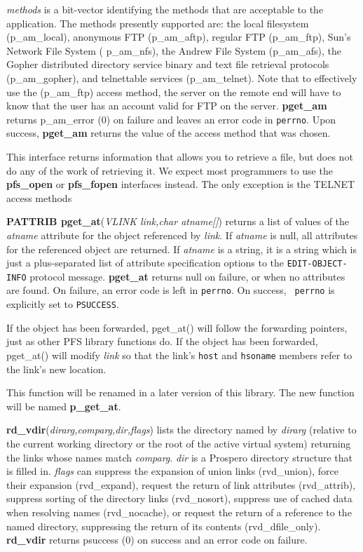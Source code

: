 {\it methods} is a bit-vector identifying the methods that are acceptable
to the application.  The methods presently supported are: the local
filesystem ({\sc p\_am\_local}), anonymous FTP ({\sc p\_am\_aftp}),
regular FTP ({\sc p\_am\_ftp}), Sun's Network File System ({\sc
p\_am\_nfs}), the Andrew File System ({\sc p\_am\_afs}), the Gopher
distributed directory service binary and text file retrieval protocols
({\sc p\_am\_gopher}), and telnettable services ({\sc p\_am\_telnet}).
Note that to effectively use the ({\sc p\_am\_ftp}) access method, the
server on the remote end will have to know that the user has an
account valid for FTP on the server.  {\bf pget\_am} returns {\sc
p\_am\_error} (0) on failure and leaves an error code in {\tt perrno}.
Upon success, {\bf pget\_am} returns the value of the access method
that was chosen.

This interface returns information that allows you to retrieve a file,
but does not do any of the work of retrieving it.  We expect most
programmers to use the {\bf pfs\_open} or {\bf pfs\_fopen} interfaces
instead.  The only exception is the TELNET access methods

{\bf PATTRIB pget\_at}({\it VLINK link,char atname[]}) returns a list of values of
the {\it atname} attribute for the object referenced by {\it link}.
If {\it atname} is {\sc null}, all attributes for the referenced
object are returned.  If {\it atname} is a string, it is a string
which is just a plus-separated list of attribute specification options
to the {\tt EDIT-OBJECT-INFO} protocol message.  {\bf pget\_at}
returns {\sc null} on failure, or when no attributes are found.  On
failure, an error code is left in {\tt perrno}.  On success, {\tt
perrno} is explicitly set to {\tt PSUCCESS}.

If the object has been forwarded, pget\_at() will follow the
forwarding pointers, just as other PFS library functions do.  If the
object has been forwarded, pget\_at() will modify {\it link}  so that
the link's {\tt host} and {\tt hsoname} members refer to the link's
new location.

This function will be renamed in a later version of this library.  The
new function will be named {\bf p\_get\_at}.

{\bf rd\_vdir}({\it dirarg,comparg,dir,flags}) lists the directory
named by {\it dirarg} (relative to the current working directory or
the root of the active virtual system) returning the links whose names
match {\it comparg}.  {\it dir} is a Prospero directory structure that
is filled in.  {\it flags} can suppress the expansion of union
links ({\sc rvd\_union}), force their expansion ({\sc rvd\_expand}),
request the return of link attributes ({\sc rvd\_attrib}), suppress
sorting of the directory links ({\sc rvd\_nosort}), suppress use of
cached data when resolving names ({\sc rvd\_nocache}), or request the
return of a reference to the named directory, suppressing the return
of its contents ({\sc rvd\_dfile\_only}).  {\bf rd\_vdir} returns {\sc
psuccess} (0) on success and an error code on failure.

